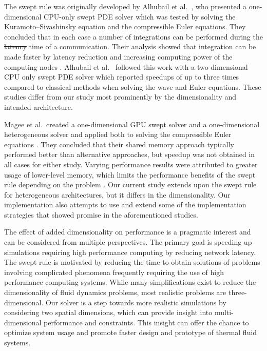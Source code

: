 \documentclass[preprints,article,accept,moreauthors,pdftex]{Definitions/mdpi}
\newcommand{\former}[2]{\sloppy\cbcolor{#2}\textcolor{#2}{\cbdelete\sout{#1}}}
\begin{document}
The swept rule was originally developed by Alhubail et al.~\cite{Alhubail2016ThePDEs}, who presented a one-dimensional CPU-only swept PDE solver which was tested by solving the Kuramoto--Sivashinsky equation and the compressible Euler equations. 
They concluded that in each case a number of integrations can be performed during the \former{latency}{revTwo} time of a communication. Their analysis showed that integration can be made faster by latency reduction and increasing computing power of the computing nodes \cite{Alhubail2016ThePDEs}. 
Alhubail et al.~\cite{Alhubail2018ThePDEs} followed this work with a two-dimensional CPU only swept PDE solver which reported speedups of up to three times compared to classical methods when solving the wave and Euler equations. 
These studies differ from our study most prominently by the dimensionality and intended architecture.

Magee et al.\ created a one-dimensional GPU swept solver and a one-dimensional heterogeneous solver and applied both to solving the compressible Euler equations \cite{Magee2018AcceleratingDecomposition,Magee2020ApplyingSystems}. 
They concluded that their shared memory approach typically performed better than alternative approaches, but speedup was not obtained in all cases for either study. Varying performance results were attributed to greater usage of lower-level memory, which limits the performance benefits of the swept rule depending on the problem \cite{Magee2018AcceleratingDecomposition}.
Our current study extends upon the swept rule for heterogeneous architectures, but it differs in the dimensionality. Our implementation also attempts to use and extend some of the implementation strategies that showed promise in the aforementioned studies.

The effect of added dimensionality on performance is a pragmatic interest and can be considered from multiple perspectives. The primary goal is speeding up simulations requiring high performance computing by reducing network latency. The swept rule is motivated by reducing the time to obtain solutions of problems involving complicated phenomena frequently requiring the use of high performance computing systems. While many simplifications exist to reduce the dimensionality of fluid dynamics problems, most realistic problems are three-dimensional. Our solver is a step towards more realistic simulations by considering two spatial dimensions, which can provide insight into multi-dimensional performance and constraints. This insight can offer the chance to optimize system usage and promote faster design and prototype of thermal fluid systems.
\end{document}
